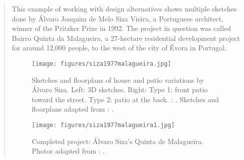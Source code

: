 				
\clearpage
{}
		\begin{quote}
		\small
		This example of working with design alternatives 
		shows multiple sketches done by \'Alvaro Joaquim de Melo Siza Vieira, 
		a Portuguese architect, winner of the Pritzker Prize in 1992.
		The project in question was called Bairro Quinta da Malagueira, 
		a 27-hectare residential development project for around 12,000 people,
		to the west of the city of \'Evora in Portugal.
		\begin{figure}[htb]
		\begin{center}
		\texttt{[image: figures/siza1977malagueira.jpg]}
		\caption{
		Sketches and floorplans of house and patio variations by \'Alvaro Siza.
		Left: 3D sketches. %
		Right: Type 1: front patio toward the street. Type 2: patio at the back. 
		\citeauthor{siza1977malagueira}: 
		\cite{siza1977malagueira}.
		Sketches and floorplans adapted from 
		\citeauthor{fleck1995siza}: 
		\cite{fleck1995siza}.}		
		\label{fig:siza1977malagueira}
		\end{center}
		\end{figure}
		
		\begin{figure}[htb]
		\begin{center}
		\texttt{[image: figures/siza1977malagueira1.jpg]}
		\caption{
		Completed project: \'Alvaro Siza's Quinta de Malagueira.
		Photos adapted from 
		\citeauthor{fleck1995siza}: 
		\cite{fleck1995siza}.
		}
		\label{fig:siza1977malagueira1}
		\end{center}
		\end{figure}		
				
		\end{quote}


\clearpage
{}

